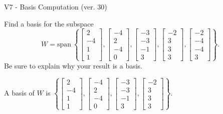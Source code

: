 \begin{exercise}
  \begin{exerciseTitle}V7 - Basis Computation (ver. 30)\end{exerciseTitle}
  \begin{exerciseStatement}
    Find a basis for the subspace 
\[W=\mathrm{span}\ \left\{\left[\begin{array}{r}
2 \\
-4 \\
1 \\
1
\end{array}\right] , \left[\begin{array}{r}
-4 \\
2 \\
-4 \\
0
\end{array}\right] , \left[\begin{array}{r}
-3 \\
-3 \\
-1 \\
3
\end{array}\right] , \left[\begin{array}{r}
-2 \\
3 \\
3 \\
3
\end{array}\right] , \left[\begin{array}{r}
-2 \\
-4 \\
-4 \\
3
\end{array}\right]\right\}.\]
 Be sure to explain why your result is a basis.


  \end{exerciseStatement}
  \begin{exerciseAnswer}
   A basis of \(W\) is  \(\left\{\left[\begin{array}{r}
2 \\
-4 \\
1 \\
1
\end{array}\right] , \left[\begin{array}{r}
-4 \\
2 \\
-4 \\
0
\end{array}\right] , \left[\begin{array}{r}
-3 \\
-3 \\
-1 \\
3
\end{array}\right] , \left[\begin{array}{r}
-2 \\
3 \\
3 \\
3
\end{array}\right]\right\}\).
  


  \end{exerciseAnswer}
\end{exercise}